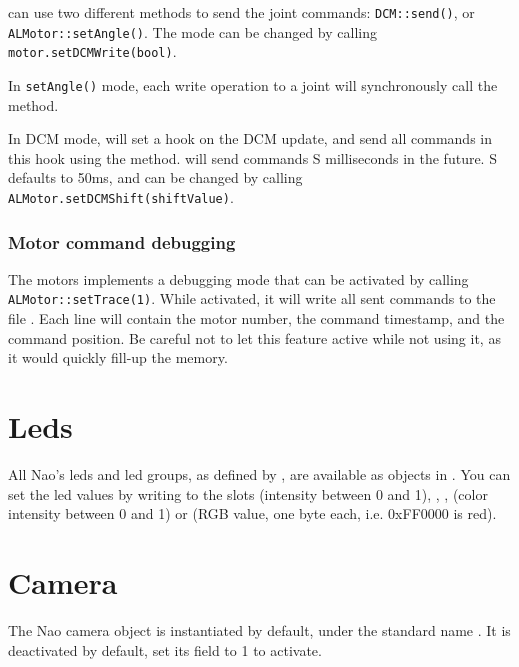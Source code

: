 \urbi can use two different methods to send the joint commands:
\lstinline|DCM::send()|, or \lstinline|ALMotor::setAngle()|.
The mode can be changed by calling \lstinline|motor.setDCMWrite(bool)|.

In \lstinline|setAngle()| mode, each write operation to a joint will
synchronously call the  \naoqi method.

In DCM mode, \urbi will set a hook on the DCM update, and send all
commands in this hook using the  method.  \urbi will
send commands S milliseconds in the future. S defaults to 50ms, and
can be changed by calling \lstinline|ALMotor.setDCMShift(shiftValue)|.

\subsubsection{Motor command debugging}

The motors implements a debugging mode that can be activated by
calling \lstinline|ALMotor::setTrace(1)|. While activated, it will
write all sent commands to the file . Each line will
contain the motor number, the command timestamp, and the command
position.  Be careful not to let this feature active while not using
it, as it would quickly fill-up the memory.

\section{Leds}

All Nao's leds and led groups, as defined by \naoqi, are available as
objects in \us. You can set the led values by writing to the slots
 (intensity between 0 and 1), , , 
(color intensity between 0 and 1) or  (RGB value, one byte
each, i.e. 0xFF0000 is red).

\section{Camera}

The Nao camera object is instantiated by default, under the standard name
. It is deactivated by default, set its  field to 1 to
activate.

